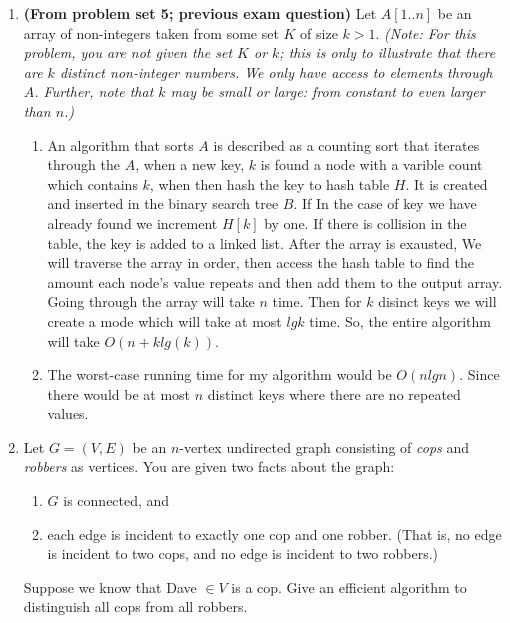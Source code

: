 \documentclass[letterpaper,11pt]{article}
\begin{document}
\begin{enumerate}

\item \textbf{(From problem set 5; previous exam question)} Let $A[1..n]$ be an array of non-integers taken from some set $K$ of size $k>1$. \emph{(Note: For this problem, you are not given the set $K$ or $k$; this is only to illustrate that there are $k$ distinct non-integer numbers. We only have access to elements through $A$. Further, note that $k$ may be small or large: from constant to even larger than $n$.)}
\begin{enumerate}
\item 
An algorithm that sorts $A$ is described as a counting sort that iterates through the $A$, when a new key, $k$ is found a node with a varible count which contains $k$, when then hash the key to hash table $H$. It is created and inserted in the binary search tree $B$. If In the case of key we have already found we increment $H[k]$ by one. If there is collision in the table, the key is added to a linked list. After the array is exausted, We will traverse the array in order, then access the hash table to find the amount each node's value repeats and then add them to the output array. Going through the array will take $n$ time. Then for $k$ disinct keys we will create a mode which will take at most $lg k$ time. So, the entire algorithm will take $O(n + klg(k))$.
 
\item 
The worst-case running time for my algorithm would be $O(n lg n)$. Since there would be at most $n$ distinct keys where there are no repeated values.
\end{enumerate}

\item Let $G=(V,E)$ be an $n$-vertex undirected graph consisting of \emph{cops} and \emph{robbers} as vertices. You are given two facts about the graph:
\begin{enumerate}
\item $G$ is connected, and
\item each edge is incident to exactly one cop and one robber. (That is, no edge is incident to two cops, and no edge is incident to two robbers.)
\end{enumerate}
Suppose we know that Dave $\in V$ is a cop. Give an efficient algorithm to distinguish all cops from all robbers.


\end{enumerate}
\end{document}

